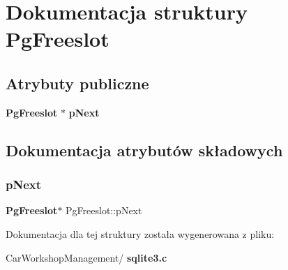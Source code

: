 \section{Dokumentacja struktury Pg\+Freeslot}
\label{struct_pg_freeslot}
\subsection*{Atrybuty publiczne}
\begin{DoxyCompactItemize}
\item 
\textbf{ Pg\+Freeslot} $\ast$ \textbf{ p\+Next}
\end{DoxyCompactItemize}


\subsection{Dokumentacja atrybutów składowych}
\mbox{\label{struct_pg_freeslot_ac38a6e51f86c650fb943585d7b6c8b70}} 
\subsubsection{pNext}
{\footnotesize\ttfamily \textbf{ Pg\+Freeslot}$\ast$ Pg\+Freeslot\+::p\+Next}



Dokumentacja dla tej struktury została wygenerowana z pliku\+:\begin{DoxyCompactItemize}
\item 
Car\+Workshop\+Management/\textbf{ sqlite3.\+c}\end{DoxyCompactItemize}
